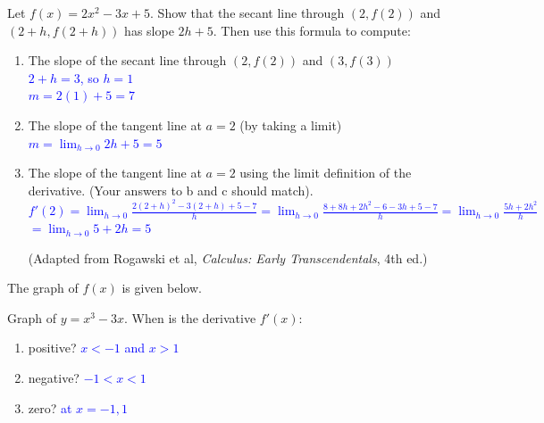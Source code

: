 \documentclass{ximera}
\begin{document}
    \begin{exercise}
    
    Let $f(x)=2x^2-3x+5$. Show that the secant line through $(2,f(2))$  and $(2+h, f(2+h))$ has slope $2h+5$. Then use this formula to compute:
    \begin{enumerate}
        \item The slope of the secant line through $(2,f(2))$  and $(3,f(3))$ \\
        \textcolor{blue}{$2+h=3$, so $h=1$\\
        $m=2(1)+5=7$}
        
         \item The slope of the tangent line at $a=2$  (by taking a limit)\\
         \textcolor{blue}{$m=\lim_{h\rightarrow 0}2h+5=5$}
        
         \item The slope of the tangent line at $a=2$ using the limit definition of the derivative. (Your answers to b and c should match).\\
         \textcolor{blue}{$f'(2)=\displaystyle\lim_{h\rightarrow 0}\frac{2(2+h)^2-3(2+h)+5-7}{h}=\lim_{h\rightarrow0}\frac{8+8h+2h^2-6-3h+5-7}{h}=\lim_{h\rightarrow0}\frac{5h+2h^2}{h}$\\
         $=\displaystyle\lim_{h\rightarrow0}5+2h=5$}
         
         (Adapted from Rogawski et al, \textit{Calculus: Early Transcendentals}, 4th ed.)
    \end{enumerate}
    \end{exercise} 

    \begin{exercise}
        The graph of $f(x)$ is given below.
        \begin{image}
        \end{image}
        \xmalt Graph of $y=x^3-3x$.
        When is the derivative $f'(x)$:
        \begin{enumerate}
            \item positive? \textcolor{blue}{$x<-1$ and $x>1$}
            \item negative? \textcolor{blue}{$-1<x<1$}
            \item zero? \textcolor{blue}{at $x=-1,1$}
        \end{enumerate}
    \end{exercise}
\end{document}
